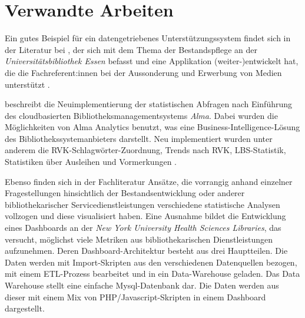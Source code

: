 



\section{Verwandte Arbeiten}

Ein gutes Beispiel für ein datengetriebenes Unterstützungssystem findet sich in
der Literatur bei , der sich mit dem Thema der Bestandspflege an der
\textit{Universitätsbibliothek Essen} befasst und eine Applikation (weiter-)entwickelt hat, die
die Fachreferent:innen bei der Aussonderung und Erwerbung von Medien
unterstützt \cite{spielberg_eike_t_fachref-assistent_nodate}.

 beschreibt die Neuimplementierung der statistischen Abfragen nach Einführung des cloudbasierten Bibliotheksmanagementsystems \textit{Alma}. 
Dabei wurden die Möglichkeiten von Alma Analytics benutzt, was eine Business-Intelligence-Lösung des Bibliothekssystemanbieters darstellt. 
Neu implementiert wurden unter anderem die RVK-Schlagwörter-Zuordnung, Trends nach RVK, LBS-Statistik, Statistiken über Ausleihen und Vormerkungen \cite{golas_statistische_2018}.

Ebenso finden sich in der Fachliteratur Ansätze, die vorrangig anhand einzelner
Fragestellungen hinsichtlich der Bestandsentwicklung\cite{hughes_long-term_2016} oder anderer
bibliothekarischer Servicedienstleistungen\cite{kutlay_shiny_2020, knievel_use_2006,meyer_using_2018} verschiedene statistische Analysen
vollzogen und diese visualisiert haben.
Eine Ausnahme bildet die Entwicklung eines Dashboards an der \textit{New York
University Health Sciences Libraries}, das versucht, möglichst viele Metriken
aus bibliothekarischen Dienstleistungen aufzunehmen. Deren Dashboard-Architektur besteht aus drei Hauptteilen. 
Die Daten werden mit Import-Skripten aus den verschiedenen Datenquellen bezogen, 
mit einem ETL-Prozess bearbeitet und in ein Data-Warehouse geladen. Das Data Warehouse 
stellt eine einfache Mysql-Datenbank dar. Die Daten werden aus dieser mit einem Mix von PHP/Javascript-Skripten in einem Dashboard 
dargestellt.\cite{morton-owens_trends_2012}

